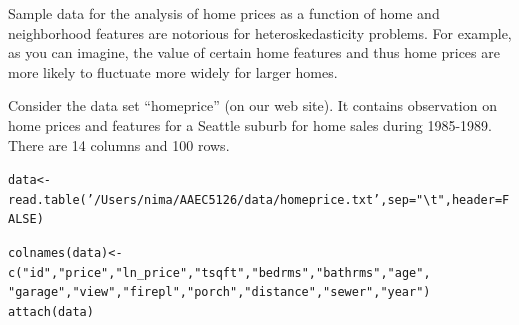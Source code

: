 \documentclass[11pt,reqno]{amsart}\usepackage[]{graphicx}\usepackage[]{color}
\makeatletter
\newcommand{\hlnum}[1]{\textcolor[rgb]{0.063,0.58,0.627}{#1}}%
\newcommand{\hlstr}[1]{\textcolor[rgb]{0.063,0.58,0.627}{#1}}%
\newcommand{\hlstd}[1]{\textcolor[rgb]{0.196,0.196,0.196}{#1}}%
\newcommand{\hlkwb}[1]{\textcolor[rgb]{0.627,0,0.314}{#1}}%
\newcommand{\hlkwc}[1]{\textcolor[rgb]{0,0.631,0.314}{#1}}%
\newcommand{\hlkwd}[1]{\textcolor[rgb]{0.78,0.227,0.412}{#1}}%
\newenvironment{kframe}{%
 \def\at@end@of@kframe{}%
 \ifinner\ifhmode%
  \def\at@end@of@kframe{\end{minipage}}%
  \begin{minipage}{\columnwidth}%
 \fi\fi%
 \def\FrameCommand##1{\hskip\@totalleftmargin \hskip-\fboxsep
 \colorbox{shadecolor}{##1}\hskip-\fboxsep
     \hskip-\linewidth \hskip-\@totalleftmargin \hskip\columnwidth}%
 \MakeFramed {\advance\hsize-\width
   \@totalleftmargin\z@ \linewidth\hsize
   \@setminipage}}%
 {\par\unskip\endMakeFramed%
 \at@end@of@kframe}
\newenvironment{knitrout}{}{} %
\makeatother
\begin{document}
Sample data for the analysis of home prices as a function of home and neighborhood features are notorious for heteroskedasticity problems.  For example, as you can imagine, the value of certain home features and thus home prices are more likely to fluctuate more widely for larger homes.   

Consider the data set “homeprice” (on our web site).  It contains observation on home prices and features for a Seattle suburb for home sales during 1985-1989.  There are 14 columns and 100 rows. 
\begin{knitrout}
\color{fgcolor}\begin{kframe}
\begin{alltt}
\hlstd{data} \hlkwb{<-} \hlkwd{read.table}\hlstd{(}\hlstr{'/Users/nima/AAEC5126/data/homeprice.txt'}\hlstd{,} \hlkwc{sep}\hlstd{=}\hlstr{"\textbackslash{}t"}\hlstd{,} \hlkwc{header}\hlstd{=}\hlnum{FALSE}\hlstd{)}

\hlkwd{colnames}\hlstd{(data)} \hlkwb{<-} \hlkwd{c}\hlstd{(}\hlstr{"id"}\hlstd{,} \hlstr{"price"}\hlstd{,} \hlstr{"ln_price"}\hlstd{,} \hlstr{"tsqft"}\hlstd{,}\hlstr{"bedrms"}\hlstd{,} \hlstr{"bathrms"}\hlstd{,} \hlstr{"age"}\hlstd{,}
                   \hlstr{"garage"}\hlstd{,} \hlstr{"view"}\hlstd{,} \hlstr{"firepl"}\hlstd{,} \hlstr{"porch"}\hlstd{,} \hlstr{"distance"}\hlstd{,} \hlstr{"sewer"}\hlstd{,} \hlstr{"year"}\hlstd{)}
\hlkwd{attach}\hlstd{(data)}
\end{alltt}
\end{kframe}
\end{knitrout}
\end{document}
